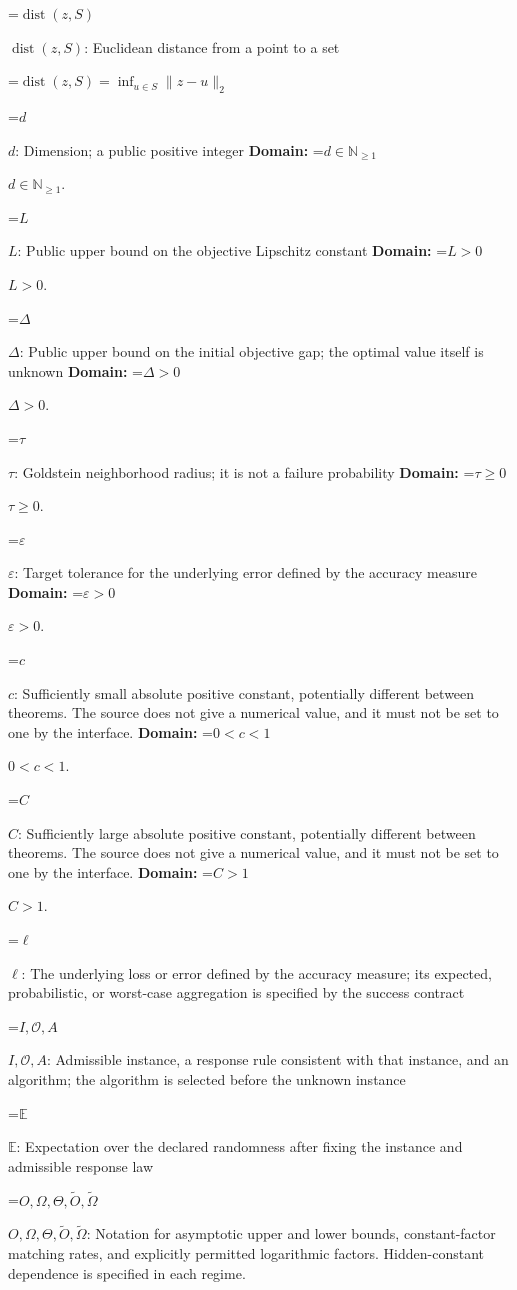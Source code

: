 \documentclass[10pt,a4paper]{article}
\newcommand{\AtlasMath}[1]{\par\begingroup\centering\setbox0=\hbox{$\displaystyle #1$}\ifdim\wd0>1.4\linewidth\typeout{ATLAS WIDE FORMULA: \the\wd0}\fi\ifdim\wd0>\linewidth\resizebox{\linewidth}{!}{\box0}\else\box0\fi\par\endgroup}
\newcommand{\AtlasInlineMath}[1]{\begingroup\setbox0=\hbox{$#1$}\ifdim\wd0>.4\linewidth\endgroup\AtlasMath{#1}\else\endgroup$#1$\fi}
\begin{document}
\AtlasInlineMath{\operatorname{dist}(z,S)}: Euclidean distance from a point to a set


\AtlasMath{\operatorname{dist}(z,S)=\inf_{u\in S}\|z-u\|_2}


\AtlasInlineMath{d}: Dimension; a public positive integer \textbf{Domain:} \AtlasInlineMath{d\in\mathbb{N}_{\ge1}}.

\AtlasInlineMath{L}: Public upper bound on the objective Lipschitz constant \textbf{Domain:} \AtlasInlineMath{L>0}.

\AtlasInlineMath{\Delta}: Public upper bound on the initial objective gap; the optimal value itself is unknown \textbf{Domain:} \AtlasInlineMath{\Delta>0}.

\AtlasInlineMath{\tau}: Goldstein neighborhood radius; it is not a failure probability \textbf{Domain:} \AtlasInlineMath{\tau\ge0}.

\AtlasInlineMath{\varepsilon}: Target tolerance for the underlying error defined by the accuracy measure \textbf{Domain:} \AtlasInlineMath{\varepsilon>0}.

\AtlasInlineMath{c}: Sufficiently small absolute positive constant, potentially different between theorems. The source does not give a numerical value, and it must not be set to one by the interface. \textbf{Domain:} \AtlasInlineMath{0<c<1}.

\AtlasInlineMath{C}: Sufficiently large absolute positive constant, potentially different between theorems. The source does not give a numerical value, and it must not be set to one by the interface. \textbf{Domain:} \AtlasInlineMath{C>1}.

\AtlasInlineMath{\ell}: The underlying loss or error defined by the accuracy measure; its expected, probabilistic, or worst-case aggregation is specified by the success contract

\AtlasInlineMath{I,\mathcal{O},A}: Admissible instance, a response rule consistent with that instance, and an algorithm; the algorithm is selected before the unknown instance

\AtlasInlineMath{\mathbb{E}}: Expectation over the declared randomness after fixing the instance and admissible response law

\AtlasInlineMath{O,\Omega,\Theta,\widetilde{O},\widetilde\Omega}: Notation for asymptotic upper and lower bounds, constant-factor matching rates, and explicitly permitted logarithmic factors. Hidden-constant dependence is specified in each regime.
\end{document}

